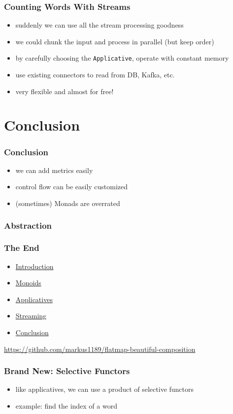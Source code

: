 \documentclass[aspectratio=169]{beamer}
\begin{document}
\begin{frame}
  \frametitle{Counting Words With Streams}
  \begin{itemize}
  \item suddenly we can use all the stream processing goodness
  \item we could chunk the input and process in parallel (but keep order)
  \item by carefully choosing the \texttt{Applicative}, operate with constant memory
  \item use existing connectors to read from DB, Kafka, etc.
  \item very flexible and almost for free!
  \end{itemize}
\end{frame}

\section{Conclusion}\label{sec:conclusion}

\begin{frame}
  \frametitle{Conclusion}
  \begin{itemize}
  \item we can add metrics easily
  \item control flow can be easily customized
  \item (sometimes) Monads are overrated
  \end{itemize}
\end{frame}

\begin{frame}
  \frametitle{Abstraction}
\end{frame}

\begin{frame}
  \frametitle{The End}
  \begin{itemize}
  \item \hyperref[sec:introduction]{Introduction}
  \item \hyperref[sec:monoids]{Monoids}
  \item \hyperref[sec:applicatives]{Applicatives}
  \item \hyperref[sec:streaming]{Streaming}
  \item \hyperref[sec:conclusion]{Conclusion}
  \end{itemize}
  \vfill
  \url{https://github.com/markus1189/flatmap-beautiful-composition}
\end{frame}

\appendix{}

\begin{frame}
  \frametitle{Brand New: Selective Functors}
  \begin{itemize}
  \item like applicatives, we can use a product of selective functors
  \item example: find the index of a word
  \end{itemize}
\end{frame}
\end{document}
